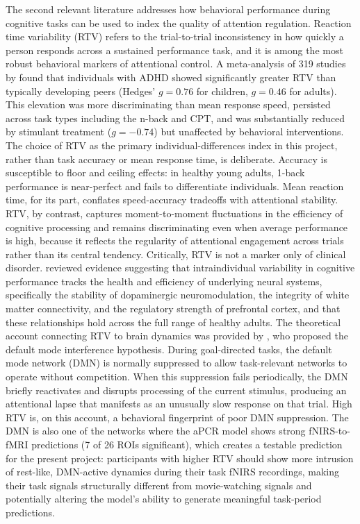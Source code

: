 The second relevant literature addresses how behavioral performance during cognitive tasks can be used to index the quality of attention regulation. Reaction time variability (RTV) refers to the trial-to-trial inconsistency in how quickly a person responds across a sustained performance task, and it is among the most robust behavioral markers of attentional control. A meta-analysis of 319 studies by \citet{kofler2013} found that individuals with ADHD showed significantly greater RTV than typically developing peers (Hedges' $g = 0.76$ for children, $g = 0.46$ for adults). This elevation was more discriminating than mean response speed, persisted across task types including the n-back and CPT, and was substantially reduced by stimulant treatment ($g = -0.74$) but unaffected by behavioral interventions. The choice of RTV as the primary individual-differences index in this project, rather than task accuracy or mean response time, is deliberate. Accuracy is susceptible to floor and ceiling effects: in healthy young adults, 1-back performance is near-perfect and fails to differentiate individuals. Mean reaction time, for its part, conflates speed-accuracy tradeoffs with attentional stability. RTV, by contrast, captures moment-to-moment fluctuations in the efficiency of cognitive processing and remains discriminating even when average performance is high, because it reflects the regularity of attentional engagement across trials rather than its central tendency. Critically, RTV is not a marker only of clinical disorder. \citet{macdonald2009} reviewed evidence suggesting that intraindividual variability in cognitive performance tracks the health and efficiency of underlying neural systems, specifically the stability of dopaminergic neuromodulation, the integrity of white matter connectivity, and the regulatory strength of prefrontal cortex, and that these relationships hold across the full range of healthy adults. The theoretical account connecting RTV to brain dynamics was provided by \citet{sonugabarke2007}, who proposed the default mode interference hypothesis. During goal-directed tasks, the default mode network (DMN) is normally suppressed to allow task-relevant networks to operate without competition. When this suppression fails periodically, the DMN briefly reactivates and disrupts processing of the current stimulus, producing an attentional lapse that manifests as an unusually slow response on that trial. High RTV is, on this account, a behavioral fingerprint of poor DMN suppression. The DMN is also one of the networks where the aPCR model shows strong fNIRS-to-fMRI predictions (7 of 26 ROIs significant), which creates a testable prediction for the present project: participants with higher RTV should show more intrusion of rest-like, DMN-active dynamics during their task fNIRS recordings, making their task signals structurally different from movie-watching signals and potentially altering the model's ability to generate meaningful task-period predictions.

